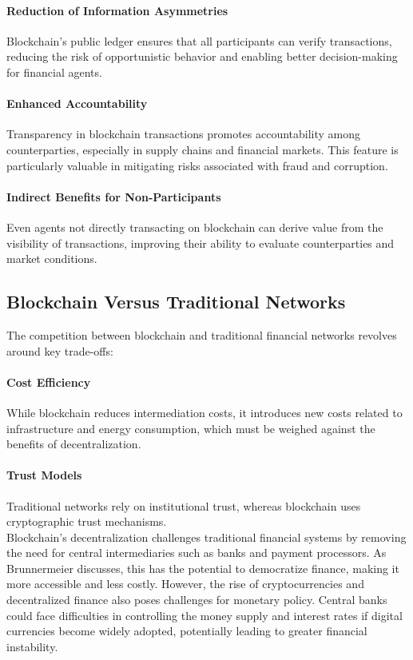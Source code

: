 \paragraph{Reduction of Information Asymmetries}
Blockchain's public ledger ensures that all participants can verify transactions, reducing the risk of opportunistic behavior and enabling better decision-making for financial agents. 

\paragraph{Enhanced Accountability}
Transparency in blockchain transactions promotes accountability among counterparties, especially in supply chains and financial markets. This feature is particularly valuable in mitigating risks associated with fraud and corruption.

\paragraph{Indirect Benefits for Non-Participants}
Even agents not directly transacting on blockchain can derive value from the visibility of transactions, improving their ability to evaluate counterparties and market conditions. \cite{iyengar_economics_2023}

\subsection{Blockchain Versus Traditional Networks}

The competition between blockchain and traditional financial networks revolves around key trade-offs:

\paragraph{Cost Efficiency}
While blockchain reduces intermediation costs, it introduces new costs related to infrastructure and energy consumption, which must be weighed against the benefits of decentralization.

\paragraph{Trust Models}
Traditional networks rely on institutional trust, whereas blockchain uses cryptographic trust mechanisms. \\

Blockchain's decentralization challenges traditional financial systems by removing the need for central intermediaries such as banks and payment processors. As Brunnermeier discusses, this has the potential to democratize finance, making it more accessible and less costly. However, the rise of cryptocurrencies and decentralized finance also poses challenges for monetary policy. Central banks could face difficulties in controlling the money supply and interest rates if digital currencies become widely adopted, potentially leading to greater financial instability.
\cite{abadi_blockchain_2022} \\

